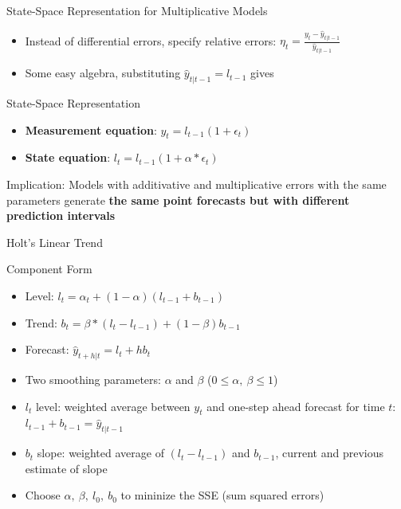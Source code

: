 \documentclass{beamer}
\begin{document}
\begin{frame}{State-Space Representation for Multiplicative Models}
  \begin{itemize}
  \item Instead of differential errors, specify relative errors: $\eta_t = \frac{y_t - \hat{y}_{t|t-1}}{ \hat{y}_{t|t-1}}$
  \item Some easy algebra, substituting $\hat{y}_{t|t-1} = l_{t-1}$ gives   
  \end{itemize}

  \begin{alertblock}{State-Space Representation}
    \begin{itemize}
    \item \textbf{Measurement equation}: $y_t = l_{t-1}(1+\epsilon_t)$
    \item \textbf{State equation}: $l_t = l_{t-1}(1+\alpha*\epsilon_t)$
    \end{itemize}
  \end{alertblock}

Implication: Models with additivative and multiplicative errors with the same parameters generate \textbf{the same point forecasts but with different prediction intervals}
  
\end{frame}


\begin{frame}{Holt's Linear Trend}

  \begin{block}{Component Form}
    \begin{itemize}
    \item Level: $l_t = \alpha_t + (1-\alpha)(l_{t-1}+ b_{t-1})$
    \item Trend: $b_t = \beta*(l_t - l_{t-1}) + (1-\beta)b_{t-1}$
    \item Forecast: $\hat{y}_{t+h|t}=  l_t + hb_t$
    \end{itemize}
  \end{block}

  \begin{itemize}
  \item Two smoothing parameters: $\alpha$ and $\beta$ ($0 \leq \alpha, \ \beta \leq 1$)
  \item $l_t$ level: weighted average between $y_t$ and one-step ahead forecast for time $t$: $l_{t-1} + b_{t-1} = \hat{y}_{t|t-1}$
  \item $b_t$ slope: weighted average of $(l_t - l_{t-1})$ and $b_{t-1}$, current and previous estimate of slope
  \item Choose $\alpha, \ \beta, \ l_0, \ b_0$ to mininize the SSE (sum squared errors)
  \end{itemize}
\end{frame}
\end{document}
